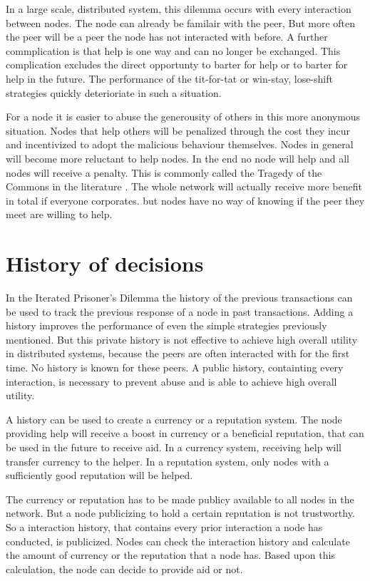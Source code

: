 In a large scale, distributed system, this dilemma occurs with every interaction between nodes.
The node can already be familair with the peer,
But more often the peer will be a peer the node has not interacted with before.
A further commplication is that help is one way and can no longer be exchanged.
This complication excludes the direct opportunty to barter for help 
or to barter for help in the future\cite{Lai-Incentives}.
The performance of the tit-for-tat or win-stay, lose-shift strategies
quickly deterioriate in such a situation.

For a node it is easier to abuse the generousity of others in this more anonymous situation.
Nodes that help others will be penalized through the cost they incur
and incentivized to adopt the malicious behaviour themselves.
Nodes in general will become more reluctant to help nodes\cite{Nowak-PrisonerDilemma}.
In the end no node will help and all nodes will receive a penalty.
This is commonly called the Tragedy of the Commons in the literature \cite{hardin-tragedy}.
The whole network will actually receive more benefit in total if everyone corporates.
but nodes have no way of knowing if the peer they meet are willing to help.

\section{History of decisions}

In the Iterated Prisoner's Dilemma the history of the previous transactions can be used 
to track the previous response of a node in past transactions.
Adding a history improves the performance of even the simple strategies previously mentioned.
But this private history is not effective to achieve high overall utility in distributed systems,
because the peers are often interacted with for the first time.
No history is known for these peers.
A public history, containting every interaction, is necessary to prevent abuse
and is able to achieve high overall utility\cite{Lai-Incentives}.

A history can be used to create a currency or a reputation system.
The node providing help will receive a boost in currency or a beneficial reputation, 
that can be used in the future to receive aid.
In a currency system, receiving help will transfer currency to the helper.
In a reputation system, only nodes with a sufficiently good reputation will be helped.

The currency or reputation has to be made publicy available to all nodes in the network.
But a node publicizing to hold a certain reputation is not trustworthy.
So a interaction history, that contains every prior interaction a node has conducted, is publicized.
Nodes can check the interaction history and calculate the amount of currency 
or the reputation that a node has.
Based upon this calculation, the node can decide to provide aid or not.

